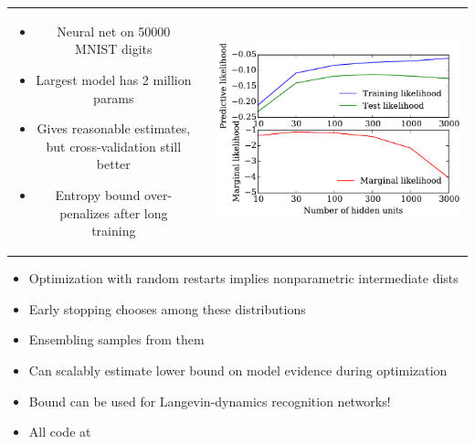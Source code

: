 \documentclass[portrait,a0b,final,a4resizeable]{include/a0poster}
\begin{document}
\begin{poster}
\begin{multicols}{2}
\begin{tabular}{ccc}
\begin{minipage}[c]{0.35\columnwidth}
\begin{itemize} 
\item Neural net on 50000 MNIST digits
\item Largest model has 2 million params
\item Gives reasonable estimates, but cross-validation still better
\item Entropy bound over-penalizes after long training
\end{itemize}
\end{minipage} & &
\begin{minipage}[c]{0.55\columnwidth}
\includegraphics[width=\columnwidth]{../experiments/2015_03_03_vary_width/7_hidden_units_higher_learnrate/vary_widths.pdf}
\end{minipage}
\end{tabular}


\vspace{0.5in}
\begin{itemize}
\item Optimization with random restarts implies nonparametric intermediate dists
\item Early stopping chooses among these distributions
\item Ensembling samples from them
\item Can scalably estimate lower bound on model evidence during optimization
\item Bound can be used for Langevin-dynamics recognition networks!
\item All code at {}
\end{itemize}


\end{multicols}
\end{poster}
\end{document}
